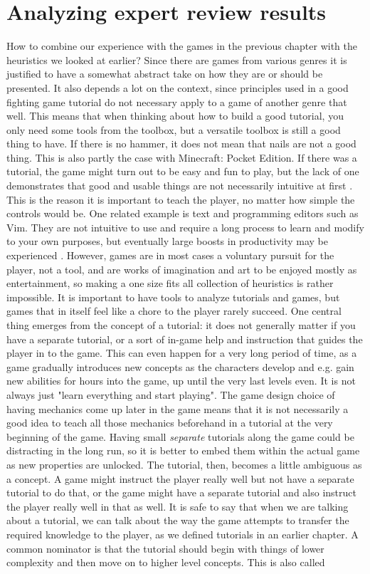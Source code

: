 \chapter{Analyzing expert review results}

How to combine our experience with the games in the previous chapter with the heuristics we looked at earlier? Since there are games from various genres it is justified to have a somewhat abstract take on how they are or should be presented. It also depends a lot on the context, since principles used in a good fighting game tutorial do not necessary apply to a game of another genre that well. This means that when thinking about how to build a good tutorial, you only need some tools from the toolbox, but a versatile toolbox is still a good thing to have. If there is no hammer, it does not mean that nails are not a good thing. This is also partly the case with Minecraft: Pocket Edition. If there was a tutorial, the game might turn out to be easy and fun to play, but the lack of one demonstrates that good and usable things are not necessarily intuitive at first \cite{Raskin1994}. This is the reason it is important to teach the player, no matter how simple the controls would be. One related example is text and programming editors such as Vim. They are not intuitive to use and require a long process to learn and modify to your own purposes, but eventually large boosts in productivity may be experienced \cite{Robbins2008}. However, games are in most cases a voluntary pursuit for the player, not a tool, and are works of imagination and art to be enjoyed mostly as entertainment, so making a one size fits all collection of heuristics is rather impossible. It is important to have tools to analyze tutorials and games, but games that in itself feel like a chore to the player rarely succeed. One central thing emerges from the concept of a tutorial: it does not generally matter if you have a separate tutorial, or a sort of in-game help and instruction that guides the player in to the game. This can even happen for a very long period of time, as a game gradually introduces new concepts as the characters develop and e.g. gain new abilities for hours into the game, up until the very last levels even. It is not always just "learn everything and start playing". The game design choice of having mechanics come up later in the game means that it is not necessarily a good idea to teach all those mechanics beforehand in a tutorial at the very beginning of the game. Having small \textit{separate} tutorials along the game could be distracting in the long run, so it is better to embed them within the actual game as new properties are unlocked. The tutorial, then, becomes a little ambiguous as a concept. A game might instruct the player really well but not have a separate tutorial to do that, or the game might have a separate tutorial and also instruct the player really well in that as well. It is safe to say that when we are talking about a tutorial, we can talk about the way the game attempts to transfer the required knowledge to the player, as we defined tutorials in an earlier chapter. A common nominator is that the tutorial should begin with things of lower complexity and then move on to higher level concepts. This is also called 